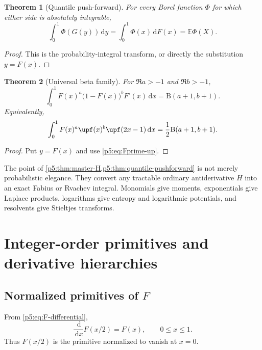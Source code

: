 \documentclass[11pt,oneside]{article}
\newtheorem{theorem}{Theorem}[section]
\theoremstyle{definition}
\theoremstyle{remark}
\newcommand{\E}{\mathbb E}
\newcommand{\dd}{\,\mathrm d}
\newcommand{\1}{\mathbf 1}
\begin{document}
\begin{theorem}[Quantile push-forward]\label{p5:thm:quantile-pushforward}
For every Borel function $\Phi$ for which either side is absolutely integrable,
\begin{equation}\label{p5:eq:quantile-pushforward}
 \int_0^1\Phi(G(y))\dd y
 =\int_0^1\Phi(x)\dd F(x)
 =\E\Phi(X).
\end{equation}
\end{theorem}

\begin{proof}
This is the probability-integral transform, or directly the substitution $y=F(x)$.
\end{proof}

\begin{theorem}[Universal beta family]\label{p5:thm:beta-family}
For $\Re a>-1$ and $\Re b>-1$,
\begin{equation}\label{p5:eq:beta-family}
 \int_0^1F(x)^a\bigl(1-F(x)\bigr)^bF'(x)\dd x
 =\mathrm B(a+1,b+1).
\end{equation}
Equivalently,
\begin{equation}\label{p5:eq:beta-up-family}
 \int_0^1F(x)^a\upf(x)^b\upf(2x-1)\dd x
 =\frac12\mathrm B(a+1,b+1).
\end{equation}
\end{theorem}

\begin{proof}
Put $y=F(x)$ and use \eqref{p5:eq:Fprime-up}.
\end{proof}

The point of \cref{p5:thm:master-H,p5:thm:quantile-pushforward} is not merely probabilistic elegance.  They convert any tractable ordinary antiderivative $H$ into an exact Fabius or Rvachev integral.  Monomials give moments, exponentials give Laplace products, logarithms give entropy and logarithmic potentials, and resolvents give Stieltjes transforms.

\section{Integer-order primitives and derivative hierarchies}

\subsection{Normalized primitives of $F$}

From \eqref{p5:eq:F-differential},
\begin{equation}\label{p5:eq:first-primitive-F}
 \frac{\dd}{\dd x}F(x/2)=F(x),
 \qquad 0\le x\le1.
\end{equation}
Thus $F(x/2)$ is the primitive normalized to vanish at $x=0$.
\end{document}
